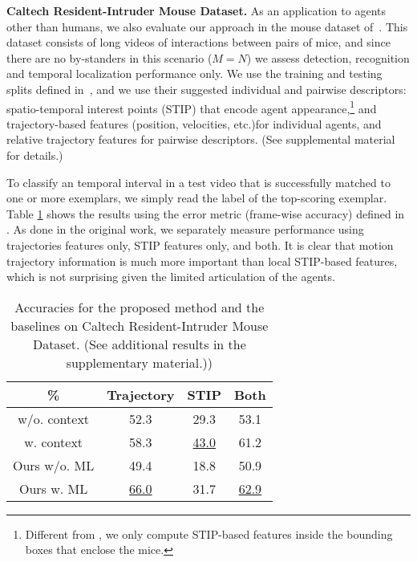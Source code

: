 \vspace{0.05in} \noindent\textbf{Caltech Resident-Intruder Mouse Dataset.} As an application to agents other than humans, we also evaluate our approach in the mouse dataset of~\cite{CRIM13}. This dataset consists of long videos of interactions between pairs of mice, and since there are no by-standers in this scenario (\ie $M=N$) we assess detection, recognition and temporal localization performance only. We use the training and testing splits defined in~\cite{CRIM13}, and we use their suggested individual and pairwise descriptors: spatio-temporal interest points (STIP) that encode agent appearance,\footnote{Different from \cite{CRIM13}, we only compute STIP-based features inside the bounding boxes that enclose the mice.} and trajectory-based features (position, velocities, etc.)for individual agents, and relative trajectory features for pairwise descriptors. (See supplemental material for details.)

To classify an temporal interval in a test video that is successfully matched to one or more exemplars, we simply read the label of the top-scoring exemplar. Table \ref{CRIMAccu} shows the results using the error metric (frame-wise accuracy) defined in \cite{CRIM13}. As done in the original work, we separately measure performance using trajectories features only, STIP features only, and both. It is clear that motion trajectory information is much more important than local STIP-based features, which is not surprising given the limited articulation of the agents.

\begin{table}[h]
\vspace{-5pt}
\centering \caption{Accuracies for the proposed method and the baselines on Caltech Resident-Intruder Mouse Dataset. (See additional results in the supplementary material.))}
\footnotesize{
\begin{tabular}{|c||c|c|c|}
\hline  \% & Trajectory & STIP & Both \\
\hline \cite{CRIM13} w/o. context & 52.3 & 29.3 & 53.1\\
\hline \cite{CRIM13} w. context & 58.3 & \underline{43.0} & 61.2\\
\hline Ours w/o. ML & 49.4 & 18.8 & 50.9 \\
\hline Ours w. ML & \underline{66.0} & 31.7 & \underline{62.9}\\
\hline 
\end{tabular}
}
\label{CRIMAccu}
\vspace{-5pt}
\end{table}

